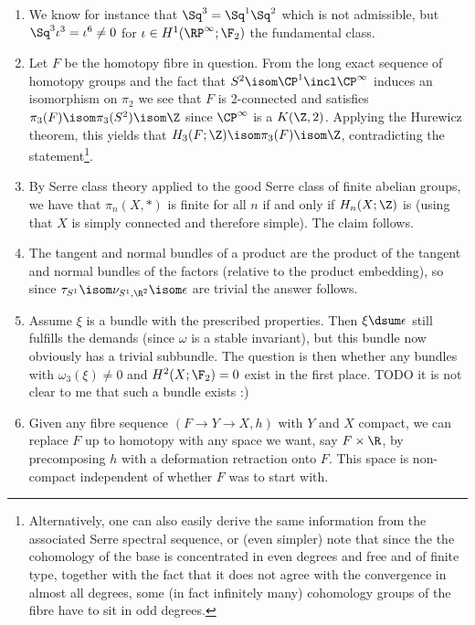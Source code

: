 \begin{answers}
\begin{enumerate}
		\item {} We know for instance that $\Sq^3 = \Sq^1 \Sq^2$ which is not admissible, but $\Sq^3 \iota^3 = \iota^6 \neq 0$ for $\iota \in H^1(\RP^\infty; \F_2)$ the fundamental class.
		\item {} Let $F$ be the homotopy fibre in question.
			From the long exact sequence of homotopy groups and the fact that $S^2 \isom \CP^1 \incl \CP^\infty$ induces an isomorphism on $\pi_2$ we see that $F$ is 2-connected and satisfies $\pi_3(F) \isom \pi_3(S^2) \isom \Z$ since $\CP^\infty$ is a $K(\Z, 2)$.
			Applying the Hurewicz theorem, this yields that $H_3(F; \Z) \isom \pi_3(F) \isom \Z$, contradicting the statement\footnote{Alternatively, one can also easily derive the same information from the associated Serre spectral sequence, or (even simpler) note that since the the cohomology of the base is concentrated in even degrees and free and of finite type, together with the fact that it does not agree with the convergence in almost all degrees, some (in fact infinitely many) cohomology groups of the fibre have to sit in odd degrees.}.
		\item {} By Serre class theory applied to the good Serre class of finite abelian groups, we have that $\pi_n(X, *)$ is finite for all $n$ if and only if $H_n(X; \Z)$ is (using that $X$ is simply connected and therefore simple).
			The claim follows.
		\item {} The tangent and normal bundles of a product are the product of the tangent and normal bundles of the factors (relative to the product embedding), so since $\tau_{S^1} \isom \nu_{S^1, \R^2} \isom \epsilon$ are trivial the answer follows.
		\item {} Assume $\xi$ is a bundle with the prescribed properties.
			Then $\xi \dsum \epsilon$ still fulfills the demands (since $\omega$ is a stable invariant), but this bundle now obviously has a trivial subbundle.
			The question is then whether any bundles with $\omega_3(\xi) \neq 0$ and $H^2(X; \F_2) = 0$ exist in the first place. TODO it is not clear to me that such a bundle exists :)
		\item {} Given any fibre sequence $(F \to Y \to X, h)$ with $Y$ and $X$ compact, we can replace $F$ up to homotopy with any space we want, say $F \times \R$, by precomposing $h$ with a deformation retraction onto $F$.
			This space is non-compact independent of whether $F$ was to start with.
			\qedhere
	\end{enumerate}
\end{answers}
